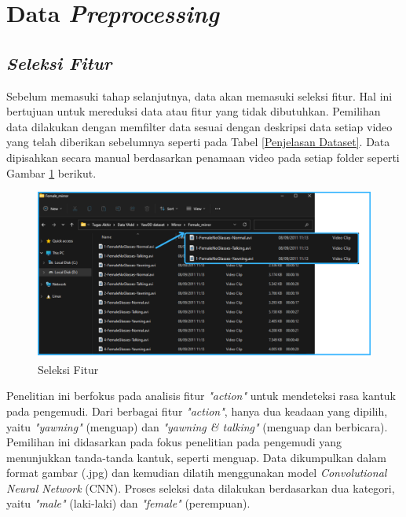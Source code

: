     

\section{Data \textit{Preprocessing}}

\subsection{\textit{Seleksi Fitur}}

    
   Sebelum memasuki tahap selanjutnya, data akan memasuki seleksi fitur. Hal ini bertujuan untuk mereduksi data atau 
   fitur yang tidak dibutuhkan. Pemilihan data dilakukan dengan memfilter data sesuai dengan deskripsi data setiap 
   video yang telah diberikan sebelumnya seperti pada Tabel \ref{Penjelasan Dataset}. Data dipisahkan secara manual 
   berdasarkan penamaan video pada setiap folder seperti Gambar \ref{Seleksi_Fitur} berikut.




     \begin{figure}[H]
         \centering
             \centering
             \includegraphics[width=\textwidth]{figures/bab4/seleksi_fitur.png}
             \caption{Seleksi Fitur}
             \label{Seleksi_Fitur}
     \end{figure}

     Penelitian ini berfokus pada analisis fitur \textit{"action"} untuk mendeteksi rasa kantuk pada pengemudi. 
     Dari berbagai fitur \textit{"action"}, hanya dua keadaan yang dipilih, yaitu \textit{"yawning"} (menguap) dan
     \textit{"yawning \& talking"} (menguap dan berbicara). Pemilihan ini didasarkan pada fokus penelitian pada
       pengemudi yang menunjukkan tanda-tanda kantuk, seperti menguap. Data dikumpulkan dalam format 
       gambar (.jpg) dan kemudian dilatih menggunakan model \textit{Convolutional Neural Network} (CNN). 
       Proses seleksi data dilakukan berdasarkan dua kategori, yaitu \textit{"male"} (laki-laki) dan \textit{"female"}
        (perempuan).
   


